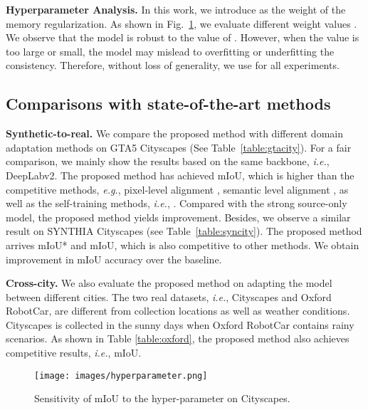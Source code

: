 \documentclass{article}
\def\eg{\emph{e.g.}}
\def\ie{\emph{i.e.}}
\begin{document}
\noindent\textbf{Hyperparameter Analysis.} In this work, we introduce  as the weight of the memory regularization. As shown in Fig.~\ref{fig:hyperparameter}, we evaluate different weight values . We observe that the model is robust to the value of . However, when the value  is too large or small, the model may mislead to overfitting or underfitting the consistency. Therefore, without loss of generality, we use  for all experiments.

\subsection{Comparisons with state-of-the-art methods}
\textbf{Synthetic-to-real.} We compare the proposed method with different domain adaptation methods on GTA5  Cityscapes (See Table~\ref{table:gtacity}). For a fair comparison, we mainly show the results based on the same backbone, \ie, DeepLabv2. The proposed method has achieved  mIoU, which is higher than the competitive methods, \eg, pixel-level alignment \cite{hoffman2018cycada}, semantic level alignment \cite{tsai2018learning}, as well as the self-training methods, \ie, \cite{zou2018unsupervised,zou2019confidence}. 
Compared with the strong source-only model, the proposed method yields  improvement. Besides, we observe a similar result on SYNTHIA  Cityscapes (see Table~\ref{table:syncity}). The proposed method arrives  mIoU* and  mIoU, which is also competitive to other methods. We obtain  improvement in mIoU accuracy over the baseline.

\noindent\textbf{Cross-city.} We also evaluate the proposed method on adapting the model between different cities. The two real datasets, \ie, Cityscapes and Oxford RobotCar, are different from collection locations as well as weather conditions. Cityscapes is collected in the sunny days when Oxford RobotCar contains rainy scenarios. As shown in Table \ref{table:oxford}, the proposed method also achieves competitive results, \ie,  mIoU.    

\begin{figure}[t]
\begin{center}
     \texttt{[image: images/hyperparameter.png]}
\end{center}
\vspace{-.2in}
      \caption{Sensitivity of mIoU to the hyper-parameter  on Cityscapes.}
      \label{fig:hyperparameter}
\end{figure}
\end{document}
